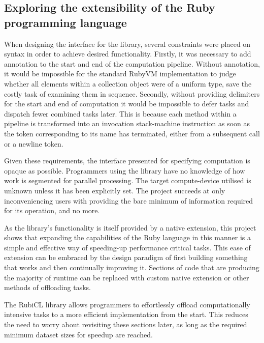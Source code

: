 \subsection{Exploring the extensibility of the Ruby programming language}
When designing the interface for the library, several constraints were placed on syntax in order to achieve desired functionality. Firstly, it was necessary to add annotation to the start and end of the computation pipeline. Without annotation, it would be impossible for the standard RubyVM implementation to judge whether all elements within a collection object were of a uniform type, save the costly task of examining them in sequence. Secondly, without providing delimiters for the start and end of computation it would be impossible to defer tasks and dispatch fewer combined tasks later. This is because each method within a pipeline is transformed into an invocation stack-machine instruction as soon as the token corresponding to its name has terminated, either from a subsequent call or a newline token.

Given these requirements, the interface presented for specifying computation is opaque as possible. Programmers using the library have no knowledge of how work is segmented for parallel processing. The target compute-device utilised is unknown unless it has been explicitly set. The project succeeds at only inconveniencing users with providing the bare minimum of information required for its operation, and no more.

As the library's functionality is itself provided by a native extension, this project shows that expanding the capabilities of the Ruby language in this manner is a simple and effective way of speeding-up performance critical tasks. This ease of extension can be embraced by the design paradigm of first building something that works and then continually improving it. Sections of code that are producing the majority of runtime can be replaced with custom native extension or other methods of offloading tasks.

The RubiCL library allows programmers to effortlessly offload computationally intensive tasks to a more efficient implementation from the start. This reduces the need to worry about revisiting these sections later, as long as the required minimum dataset sizes for speedup are reached.

